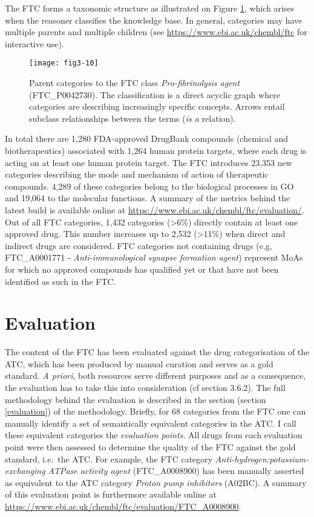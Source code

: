 The FTC forms a taxonomic structure as illustrated on Figure \ref{fig3-10}, which arises when the reasoner classifies the knowledge base. In general, categories may have multiple parents and multiple children (see \url{https://www.ebi.ac.uk/chembl/ftc} for interactive use).

\begin{figure}[ht]
    \centering
    \texttt{[image: fig3-10]}
    \caption{Parent categories to the FTC class \emph{Pro-fibrinolysis agent} (FTC\_P0042730). The classification is a direct acyclic graph where categories are describing increasingly specific concepts. Arrows entail subclass relationships between the terms (\emph{is a} relation).}
    \label{fig3-10}
\end{figure}

In total there are 1,280 FDA-approved DrugBank compounds (chemical and biotherapeutics) associated with 1,264 human protein targets, where each drug is acting on at least one human protein target. The FTC introduces 23,353 new categories describing the mode and mechanism of action of therapeutic compounds. 4,289 of these categories belong to the biological processes in GO and 19,064 to the molecular functions. A summary of the metrics behind the latest build is available online at \url{https://www.ebi.ac.uk/chembl/ftc/evaluation/}. Out of all FTC categories, 1,432 categories (\textgreater 6\%) directly contain at least one approved drug. This number increases up to 2,532 (\textgreater 11\%) when direct and indirect drugs are considered. FTC categories not containing drugs (e.g, FTC\_A0001771 - \emph{Anti-immunological synapse formation agent}) represent MoAs for which no approved compounds has qualified yet or that have not been identified as such in the FTC.

\section{Evaluation}
The content of the FTC has been evaluated against the drug categorisation of the ATC, which has been produced by manual curation and serves as a gold standard. \emph{A priori}, both resources serve different purposes and as a consequence, the evaluation has to take this into consideration (cf section 3.6.2). The full methodology behind the evaluation is described in the section (section \ref{evaluation}) of the methodology. Briefly, for 68 categories from the FTC one can manually identify a set of semantically equivalent categories in the ATC. I call these equivalent categories the \emph{evaluation points}. All drugs from each evaluation point were then assessed to determine the quality of the FTC against the gold standard, i.e.\ the ATC. For example, the FTC category \emph{Anti-hydrogen:potassium-exchanging ATPase activity agent} (FTC\_A0008900) has been manually asserted as equivalent to the ATC category \emph{Proton pump inhibitors} (A02BC). A summary of this evaluation point is furthermore available online at \url{https://www.ebi.ac.uk/chembl/ftc/evaluation/FTC\_A0008900}.

